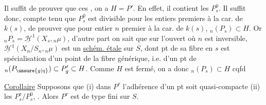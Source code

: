 Il suffit de prouver que  ces , on a $H=P'$. En effet, il  contient les $P_s^0$. Il suffit donc, compte tenu que $P_s^0$ est divisible pour les entiers premiers à la car. de $k(s)$, de prouver que  pour  entier $n$ premier à la car. de $k(s)$, $ {}_n(P_s)\subset H$. Or $ {}_nP_s=\underline{\mathscr H}^{1}(X_s,{}_n\mu)$, d'autre part on sait  que sur l'ouvert  où $n$ est inversible, $\underline{\mathscr H}^{1}(X_n/S_n,{}_n\mu)$ est un  \uline{schém. étale} sur $S$, dont  pt de sa fibre en $s$ est spécialisation d'un point de la fibre générique, i.e. d'un pt de $ {}_n(P_{\unsure{g|\eta}})\subset P'_g\subset H$. Comme $H$ est fermé, on a donc $ {}_n(P_s)\subset H$ cqfd

\uline{Corollaire} Supposons que (i)  dans $P^\tau$  l'adhérence d'un pt soit quasi-compacte (ii) les $P_s^\tau/P_s^0$,  . Alors $P^\tau$ est de type fini sur $S$.
